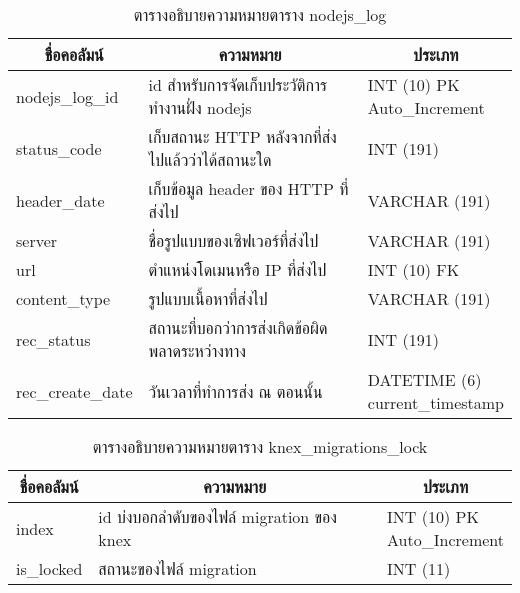 \begin{table}[H]
\caption{ตารางอธิบายความหมายตาราง nodejs\_log}\label{tbl:nodejslog}        
\begin{tabular}{|l|l|l|}
\hline
\multicolumn{1}{|c|}{ชื่อคอลัมน์} & \multicolumn{1}{c|}{ความหมาย}                     & \multicolumn{1}{c|}{ประเภท}                                                       \\ \hline
nodejs\_log\_id                   & id สำหรับการจัดเก็บประวัติการทำงานฝั่ง nodejs     & \makecell[l]{INT   (10) PK \\ Auto\_Increment}    \\ \hline
status\_code                      & เก็บสถานะ   HTTP หลังจากที่ส่งไปแล้วว่าได้สถานะใด & INT   (191)                                                                       \\ \hline
header\_date                      & เก็บข้อมูล   header ของ HTTP ที่ส่งไป             & VARCHAR   (191)                                                                   \\ \hline
server                            & ชื่อรูปแบบของเซิฟเวอร์ที่ส่งไป                    & VARCHAR   (191)                                                                   \\ \hline
url                               & ตำแหน่งโดเมนหรือ   IP ที่ส่งไป                    & INT   (10) FK                                                                     \\ \hline
content\_type                     & รูปแบบเนื้อหาที่ส่งไป                             & VARCHAR   (191)                                                                   \\ \hline
rec\_status                       & สถานะที่บอกว่าการส่งเกิดข้อผิดพลาดระหว่างทาง      & INT   (191)                                                                       \\ \hline
rec\_create\_date                 & วันเวลาที่ทำการส่ง   ณ ตอนนั้น                    & \makecell[l]{DATETIME   (6) \\ current\_timestamp}\\ \hline
\end{tabular}
\end{table}

\begin{table}[H]
\caption{ตารางอธิบายความหมายตาราง knex\_migrations\_lock}\label{tbl:knexmigrationslock}        
\begin{tabular}{|l|l|l|}
\hline
\multicolumn{1}{|c|}{ชื่อคอลัมน์} & \multicolumn{1}{c|}{ความหมาย}              & \multicolumn{1}{c|}{ประเภท}                                                   \\ \hline
index                             & id   บ่งบอกลำดับของไฟล์ migration ของ knex & \makecell[l]{INT   (10) PK\\Auto\_Increment} \\ \hline
is\_locked                        & สถานะของไฟล์   migration                   & INT (11)                                                                      \\ \hline
\end{tabular}
\end{table}

